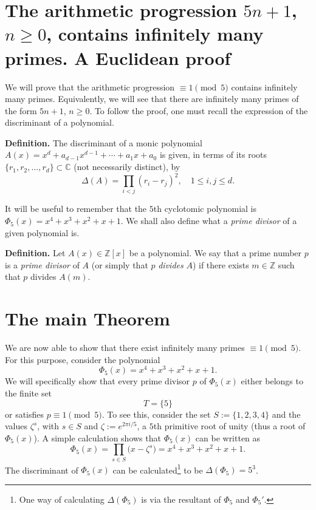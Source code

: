 \documentclass[a4paper, 12pt]{article}
\theoremstyle{definition}
\newcommand{\Z}{\mathbb{Z}}
\newcommand{\C}{\mathbb{C}}
\renewcommand\title{\textbf{The arithmetic progression $5n+1$, $n\geqslant0$, contains infinitely many primes.\\ A Euclidean proof}}
\begin{document}
\thispagestyle{plain}
\sloppy
\section{The arithmetic progression $5n+1$, $n\geqslant0$, contains infinitely many primes. A Euclidean proof}

We will prove that the arithmetic progression $\equiv 1 \pmod{5}$ contains infinitely many primes. Equivalently, we will see that there are infinitely many primes of the form $5n+1$, $n\geqslant0$. To follow the proof, one must recall the expression of the discriminant of a polynomial. 

\textbf{Definition.} The discriminant of a monic polynomial $A(x)=x^d+a_{d-1}x^{d-1}+\cdots+a_1x+a_0$ is given, in terms of its roots $\{r_1,r_2,\dots,r_d\}\subset\C$ (not necessarily distinct), by
\begin{equation}\label{eq:discrim}
	\Delta(A)=\prod_{i<j}(r_i-r_j)^2, \quad 1\leqslant i,j\leqslant d.
\end{equation}

It will be useful to remember that the $5$th cyclotomic polynomial is $\Phi_{5}(x)=x^{4} + x^{3} + x^{2} + x + 1$. We shall also define what a \emph{prime divisor} of a given polynomial is.

\textbf{Definition.} Let $A(x)\in\Z[x]$ be a polynomial. We say that a prime number $p$ is a \emph{prime divisor} of $A$ (or simply that $p$ \emph{divides} $A$) if there exists $m\in\Z$ such that $p$ divides $A(m)$.

\section{The main Theorem}\label{sec:mainTh}

We are now able to show that there exist infinitely many primes $\equiv 1\pmod{5}$. For this purpose, consider the polynomial 
\begin{equation*}
\Phi_{5}(x)=x^{4} + x^{3} + x^{2} + x + 1.
\end{equation*}
We will specifically show that every prime divisor $p$ of $\Phi_{5}(x)$ either belongs to the finite set 
\begin{equation*}
T=\{5\}
\end{equation*}
or satisfies $p\equiv 1 \pmod{5}$. To see this, consider the set $S:=\{1, 2, 3, 4\}$ and the values $\zeta^{s}$, with $s\in S$ and $\zeta:=e^{2\pi i/{5}}$, a $5$th primitive root of unity (thus a root of $\Phi_{5}(x)$). A simple calculation shows that $\Phi_{5}(x)$ can be written as
\begin{equation*}
\Phi_{5}(x)=\prod_{s\in S}\big(x-\zeta^{s}\big)=x^{4} + x^{3} + x^{2} + x + 1.
\end{equation*}
The discriminant of $\Phi_{5}(x)$ can be calculated\footnote{One way of calculating $\Delta(\Phi_{5})$ is via the resultant of $\Phi_{5}$ and $\Phi_{5}'$.} to be $\Delta(\Phi_{5})=5^{3}$.
\end{document}
